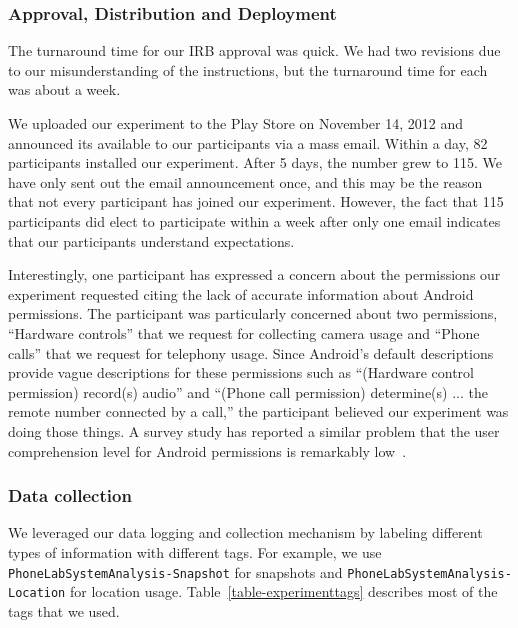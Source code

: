 \subsubsection{Approval, Distribution and Deployment}

The turnaround time for our IRB approval was quick. We had two revisions due
to our misunderstanding of the instructions, but the turnaround time for each
was about a week.

We uploaded our experiment to the Play Store on November 14, 2012 and
announced its available to our participants via a mass email. Within a day,
82 participants installed our experiment. After 5 days, the number grew to
115. We have only sent out the email announcement once, and this may be the
reason that not every participant has joined our experiment. However, the
fact that 115 participants did elect to participate within a week after only
one email indicates that our participants understand \PhoneLab{}
expectations.

Interestingly, one participant has expressed a concern about the permissions
our experiment requested citing the lack of accurate information about
Android permissions. The participant was particularly concerned about two
permissions, ``Hardware controls'' that we request for collecting camera
usage and ``Phone calls'' that we request for telephony usage. Since
Android's default descriptions provide vague descriptions for these
permissions such as ``(Hardware control permission) record(s) audio'' and
``(Phone call permission) determine(s) ... the remote number connected by a
call,'' the participant believed our experiment was doing those things. A
survey study has reported a similar problem that the user comprehension level
for Android permissions is remarkably low~\cite{felt:soups:2012}.

\subsubsection{Data collection}

We leveraged our data logging and collection mechanism by
labeling different types of information with different tags. For example,
we use \texttt{PhoneLabSystemAnalysis-Snapshot} for snapshots and
\texttt{PhoneLabSystemAnalysis-Location} for location usage.
Table~\ref{table-experimenttags} describes most of the tags that we used.

